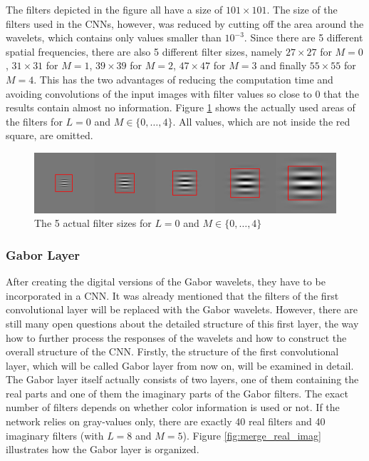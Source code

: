 \documentclass[11pt, a4paper]{article}
\begin{document}
The filters depicted in the figure all have a size of $101 \times 101$. The size of the filters used in the \acp{CNN}, however, was reduced by cutting off the area around the wavelets, which contains only values smaller than $10^{-3}$. Since there are 5 different spatial frequencies, there are also 5 different filter sizes, namely $27 \times 27$ for $M = 0$, $31 \times 31$ for $M = 1$, $39 \times 39$ for $M = 2$, $47 \times 47$ for $M = 3$ and finally $55 \times 55$ for $M = 4$. This has the two advantages of reducing the computation time and avoiding convolutions of the input images with filter values so close to 0 that the results contain almost no information. Figure \ref{fig:gabor_filter_sizes} shows the actually used areas of the filters for $L=0$ and $M \in \{0,\ldots,4\}$. All values, which are not inside the red square, are omitted.
\begin{figure}[htbp]
	\centering
	\includegraphics[width=\textwidth]{gabor_filter_sizes.png}
	\caption{The 5 actual filter sizes for $L=0$ and $M \in \{0,\ldots,4\}$}
	\label{fig:gabor_filter_sizes}
\end{figure}

\subsubsection{Gabor Layer}
\label{subsubsec:gaborlayer}

After creating the digital versions of the Gabor wavelets, they have to be incorporated in a \ac{CNN}. It was already mentioned that the filters of the first convolutional layer will be replaced with the Gabor wavelets. However, there are still many open questions about the detailed structure of this first layer, the way how to further process the responses of the wavelets and how to construct the overall structure of the \ac{CNN}. Firstly, the structure of the first convolutional layer, which will be called Gabor layer from now on, will be examined in detail. The Gabor layer itself actually consists of two layers, one of them containing the real parts and one of them the imaginary parts of the Gabor filters. The exact number of filters depends on whether color information is used or not. If the network relies on gray-values only, there are exactly 40 real filters and 40 imaginary filters (with $L = 8$ and $M = 5$). Figure \ref{fig:merge_real_imag} illustrates how the Gabor layer is organized.
\end{document}
